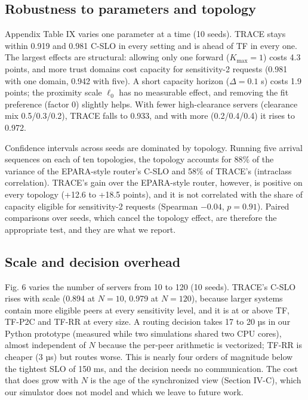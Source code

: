 \documentclass[journal]{IEEEtran}
\begin{document}
\subsection{Robustness to parameters and topology}

Appendix Table IX varies one parameter at a time (10 seeds). TRACE stays within 0.919 and 0.981 C-SLO in every setting and is ahead of TF in every one. The largest effects are structural: allowing only one forward (\(K_{\max}=1\)) costs 4.3 points, and more trust domains cost capacity for sensitivity-2 requests (0.981 with one domain, 0.942 with five). A short capacity horizon (\(\Delta=0.1\) s) costs 1.9 points; the proximity scale \(\ell_0\) has no measurable effect, and removing the fit preference (factor 0) slightly helps. With fewer high-clearance servers (clearance mix 0.5/0.3/0.2), TRACE falls to 0.933, and with more (0.2/0.4/0.4) it rises to 0.972.

Confidence intervals across seeds are dominated by topology. Running five arrival sequences on each of ten topologies, the topology accounts for 88\% of the variance of the EPARA-style router's C-SLO and 58\% of TRACE's (intraclass correlation). TRACE's gain over the EPARA-style router, however, is positive on every topology (+12.6 to +18.5 points), and it is not correlated with the share of capacity eligible for sensitivity-2 requests (Spearman \(-0.04\), \(p=0.91\)). Paired comparisons over seeds, which cancel the topology effect, are therefore the appropriate test, and they are what we report.

\subsection{Scale and decision overhead}

Fig. 6 varies the number of servers from 10 to 120 (10 seeds). TRACE's C-SLO rises with scale (0.894 at \(N=10\), 0.979 at \(N=120\)), because larger systems contain more eligible peers at every sensitivity level, and it is at or above TF, TF-P2C and TF-RR at every size. A routing decision takes 17 to 20 µs in our Python prototype (measured while two simulations shared two CPU cores), almost independent of \(N\) because the per-peer arithmetic is vectorized; TF-RR is cheaper (3 µs) but routes worse. This is nearly four orders of magnitude below the tightest SLO of 150 ms, and the decision needs no communication. The cost that does grow with \(N\) is the age of the synchronized view (Section IV-C), which our simulator does not model and which we leave to future work.
\end{document}

